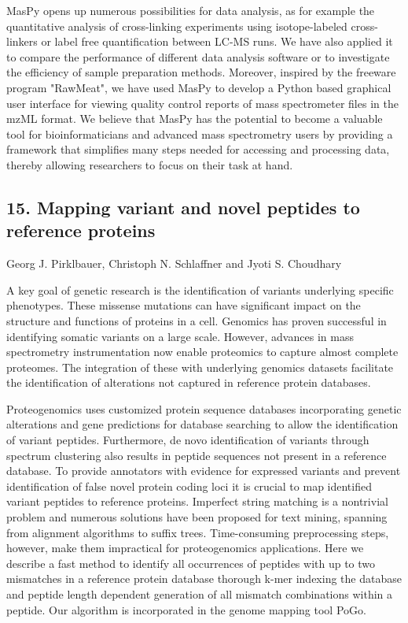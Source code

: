 MasPy opens up numerous possibilities for data analysis, as for example the
quantitative analysis of cross-linking experiments using isotope-labeled cross-
linkers or label free quantification between LC-MS runs. We have also applied it
to compare the performance of different data analysis software or to investigate
the efficiency of sample preparation methods. Moreover, inspired by the freeware
program "RawMeat", we have used MasPy to develop a Python based graphical user
interface for viewing quality control reports of mass spectrometer files in the
mzML format. We believe that MasPy has the potential to become a valuable tool
for bioinformaticians and advanced mass spectrometry users by providing a
framework that simplifies many steps needed for accessing and processing data,
thereby allowing researchers to focus on their task at hand.

\subsection*{\color{eubicRed} 15. Mapping variant and novel peptides to reference proteins}
{\color{eubicGray}Georg J. Pirklbauer, Christoph N. Schlaffner and Jyoti S. Choudhary}

A key goal of genetic research is the identification of variants underlying specific phenotypes. These missense mutations can have significant impact on the structure and functions of proteins in a cell. Genomics has proven successful in identifying somatic variants on a large scale. However, advances in mass spectrometry instrumentation now enable proteomics to capture almost complete proteomes. The integration of these with underlying genomics datasets facilitate the identification of alterations not captured in reference protein databases.

Proteogenomics uses customized protein sequence databases incorporating genetic alterations and gene predictions for database searching to allow the identification of variant peptides. Furthermore, de novo identification of variants through spectrum clustering also results in peptide sequences not present in a reference database. To provide annotators with evidence for expressed variants and prevent identification of false novel protein coding loci it is crucial to map identified variant peptides to reference proteins. Imperfect string matching is a nontrivial problem and numerous solutions have been proposed for text mining, spanning from alignment algorithms to suffix trees. Time-consuming preprocessing steps, however, make them impractical for proteogenomics applications. Here we describe a fast method to identify all occurrences of peptides with up to two mismatches in a reference protein database thorough k-mer indexing the database and peptide length dependent generation of all mismatch combinations within a peptide. Our algorithm is incorporated in the genome mapping tool PoGo.

